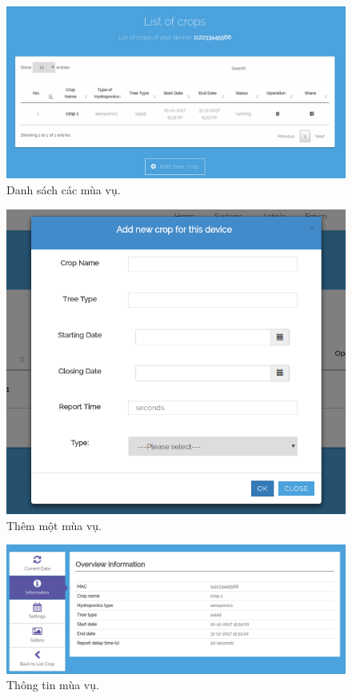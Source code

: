 \documentclass[a4paper,12pt,oneside]{article}
\begin{document}
\begin{center}
\begin{figure}[H]
\begin{center}
\includegraphics[scale=.4]{hinh/web_crop_list.png}
\end{center}
\caption{Danh sách các mùa vụ.}
\end{figure}

\begin{figure}[H]
\begin{center}
\includegraphics[scale=.5]{hinh/web_add_crop.png}
\end{center}
\caption{Thêm một mùa vụ.}
\end{figure}


\begin{figure}[H]
\begin{center}
\includegraphics[scale=.4]{hinh/web_crop_overview.png}
\end{center}
\caption{Thông tin mùa vụ.}
\end{figure}


\end{center}
\end{document}
